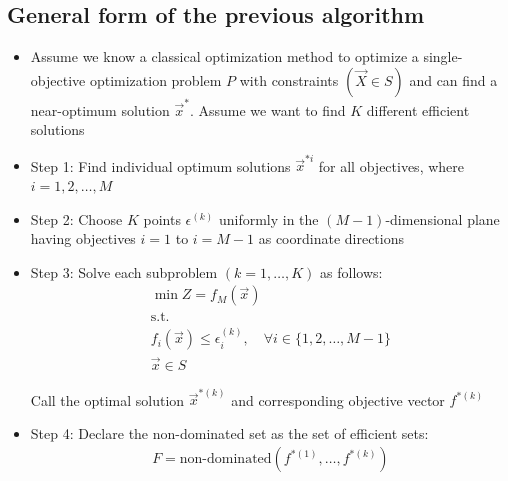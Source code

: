 \documentclass[10pt]{article}
\begin{document}
\subsection{General form of the previous algorithm}
\begin{itemize}
    \item Assume we know a classical optimization method to optimize a single-objective optimization problem $P $ with constraints $(\vec{X}\in S) $ and can find a near-optimum solution $\vec{x}^* $. Assume we want to find $K $ different efficient solutions 
    \item Step 1: Find individual optimum solutions $\vec{x}^{*i} $ for all objectives, where $i = 1, 2, \dots, M $
    \item Step 2: Choose $K $ points $\epsilon^{(k)} $ uniformly in the $(M - 1) $-dimensional plane having objectives $i = 1 $ to $i = M - 1 $ as coordinate directions 
    \item Step 3: Solve each subproblem $(k = 1, \dots, K) $ as follows:
    \begin{gather*}
        \min Z = f_M(\vec{x})\\
        \text{s.t.}\\
        f_i(\vec{x})\le \epsilon_i^{(k)},\quad\forall i \in \{1, 2, \dots, M - 1\} \\
        \vec{x}\in S
    \end{gather*}

    Call the optimal solution $\vec{x}^{*(k)} $ and corresponding objective vector $f^{*(k)} $
    \item Step 4: Declare the non-dominated set as the set of efficient sets: 
    \begin{gather*}
        F = \text{non-dominated} (f^{*(1)},\dots, f^{*(k)})
    \end{gather*}
\end{itemize}
\newpage 
\end{document}
